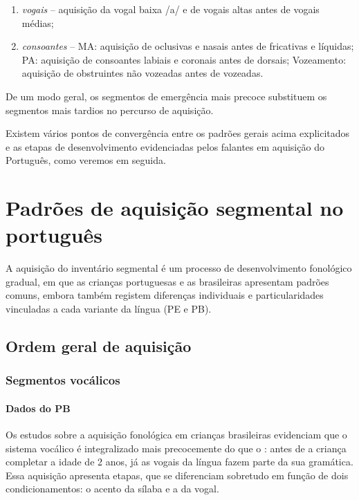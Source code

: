 \documentclass[output=paper]{LSP/langsci}
\begin{document}
\begin{enumerate}[label=\alph*)]
\item \textit{vogais} -- aquisição da vogal baixa /a/ e de vogais altas antes de vogais médias;
\item \textit{consoantes} -- MA: aquisição de oclusivas e nasais antes de fricativas e líquidas; PA: aquisição de consoantes labiais e coronais antes de dorsais; Vozeamento: aquisição de obstruintes não vozeadas antes de vozeadas.
\end{enumerate}

De um modo geral, os segmentos de emergência mais precoce substituem os segmentos mais tardios no percurso de aquisição.

Existem vários pontos de convergência entre os padrões gerais acima explicitados e as etapas de desenvolvimento evidenciadas pelos falantes em aquisição do Português, como veremos em seguida.

\section{Padrões de aquisição segmental no português}
\label{sec:matzenauer_padroes_portugues}

A aquisição do inventário segmental é um processo de desenvolvimento fonológico gradual, em que as crianças portuguesas e as brasileiras apresentam padrões comuns, embora também registem diferenças individuais e particularidades vinculadas a cada variante da língua (PE e PB). 

\subsection{Ordem geral de aquisição}
\label{subsec:matzenauer_ordem}

\subsubsection{Segmentos vocálicos}
\label{subsubsec:matzenauer_vogais}

\paragraph*{Dados do PB}
Os estudos sobre a aquisição fonológica em crianças brasileiras evidenciam que o sistema vocálico é integralizado mais precocemente do que o : antes de a criança completar a idade de 2 anos, já as vogais da língua fazem parte da sua gramática. Essa aquisição apresenta etapas, que se diferenciam sobretudo em função de dois condicionamentos: o acento da sílaba e a  da vogal.
\end{document}
